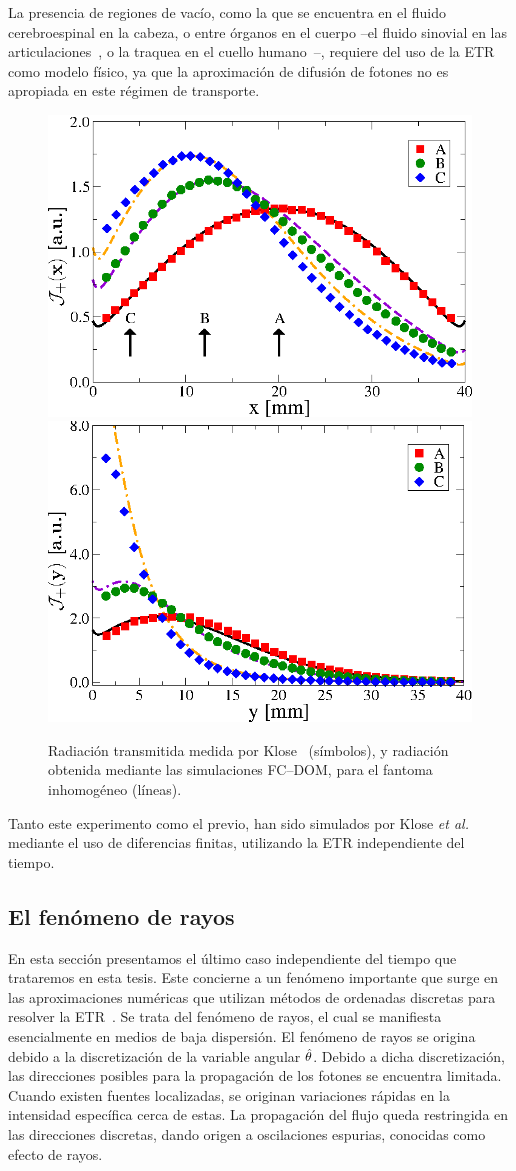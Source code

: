 La presencia de regiones de vacío, como la que se encuentra en el 
fluido cerebroespinal en la cabeza, o entre órganos en el cuerpo 
--el fluido sinovial en las articulaciones~\cite{Netz2001}, 
o la traquea en el cuello humano~\cite{Fujii2016}--, 
requiere del uso de la ETR como modelo físico, ya que la 
aproximación de difusión de fotones no es apropiada en este régimen de transporte. 
\begin{figure}[h!]
\centering
  \includegraphics[width=0.48\linewidth]{figuras/kloseph2x.eps}
  \includegraphics[width=0.48\linewidth]{figuras/ph2y.eps}
  \caption{Radiación transmitida medida por Klose~\cite{Klose2002} (símbolos),
  y radiación obtenida mediante las simulaciones FC--DOM, para 
  el fantoma inhomogéneo (líneas).}
 \label{fig:fluxph2}
\end{figure}
Tanto este experimento como el previo, han sido simulados por Klose {\it et al.} 
\cite{Klose2002} mediante el uso de diferencias finitas, utilizando la ETR 
independiente del tiempo.

\subsection{El fenómeno de rayos}
\label{subsec:rayeff}
En esta sección presentamos el último caso independiente del tiempo 
que trataremos en esta tesis. Este concierne a un 
fenómeno importante que surge en las aproximaciones numéricas 
que utilizan métodos de ordenadas discretas para resolver la ETR~\cite{Lewis1984}. 
Se trata del fenómeno de rayos, 
el cual se manifiesta esencialmente en medios de baja dispersión. 
El fenómeno de rayos se origina debido a la discretización 
de la variable angular $\hat{\theta}$. Debido a dicha discretización, 
las direcciones posibles para la propagación de los fotones 
se encuentra limitada. Cuando existen fuentes localizadas, 
se originan variaciones rápidas en la intensidad específica 
cerca de estas. La propagación del flujo queda restringida 
en las direcciones discretas, dando origen a oscilaciones 
espurias, conocidas como efecto de rayos. 

